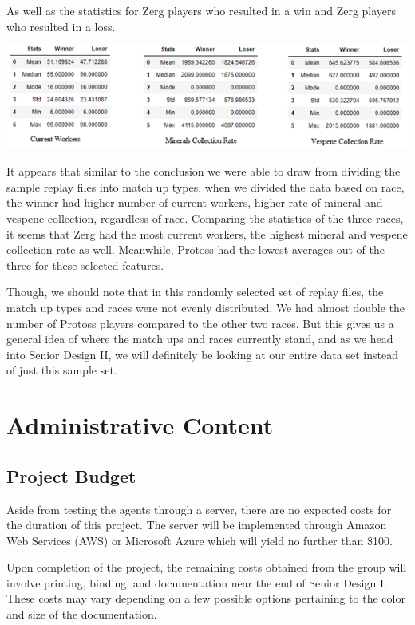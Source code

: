 \documentclass[a4paper,12pt]{report}
\begin{document}
As well as the statistics for Zerg players who resulted in a win and Zerg players who resulted in a loss. 

\begin{center}
    \captionsetup{type=figure}
    \includegraphics[width=.9\linewidth]{media/ZergWinnervsLoser.png}
\end{center}

It appears that similar to the conclusion we were able to draw from dividing the sample replay files into match up types, when we divided the data based on race, the winner had higher number of current workers, higher rate of mineral and vespene collection, regardless of race. Comparing the statistics of the three races, it seems that Zerg had the most current workers, the highest mineral and vespene collection rate as well. Meanwhile, Protoss had the lowest averages out of the three for these selected features.

Though, we should note that in this randomly selected set of replay files, the match up types and races were not evenly distributed. We had almost double the number of Protoss players compared to the other two races. But this gives us a general idea of where the match ups and races currently stand, and as we head into Senior Design II, we will definitely be looking at our entire data set instead of just this sample set.

\chapter{Administrative Content}
\section{Project Budget}

Aside from testing the agents through a server, there are no expected costs for the duration of this project. The server will be implemented through Amazon Web Services (AWS) or Microsoft Azure which will yield no further than \$100.

Upon completion of the project, the remaining costs obtained from the group will involve printing, binding, and documentation near the end of Senior Design I. These costs may vary depending on a few possible options pertaining to the color and size of the documentation.
\end{document}
